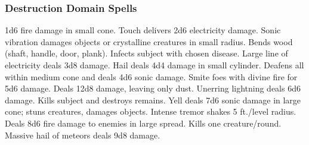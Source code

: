 \subsubsection{Destruction Domain Spells}
\begin{spelllist}
   1d6 fire damage in small cone.
   Touch delivers 2d6 electricity damage.
   Sonic vibration damages objects or crystalline creatures in small radius.
   Bends wood (shaft, handle, door, plank).
   Infects subject with chosen disease.
   Large line of electricity deals 3d8 damage.
   Hail deals 4d4 damage in small cylinder.
   Deafens all within medium cone and deals 4d6 sonic damage.
   Smite foes with divine fire for 5d6 damage.
  \spellhead[5]{}
   Deals 12d8 damage, leaving only dust.
   Unerring lightning deals 6d6 damage.
  \F Kills subject and destroys remains.
   Yell deals 7d6 sonic damage in large cone; stuns creatures, damages objects.
   Intense tremor shakes 5 ft./level radius.
   Deals 8d6 fire damage to enemies in large spread.
   Kills one creature/round.
   Massive hail of meteors deals 9d8 damage.
\end{spelllist}

